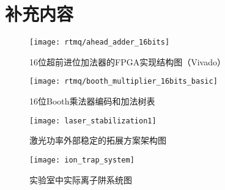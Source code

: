 
\chapter{补充内容}



\begin{figure}
    \centering
    \caption[16位超前进位加法器的FPGA实现结构图]{16位超前进位加法器的FPGA实现结构图（Vivado）\label{fig:ahead_adder_16bits}}
    \texttt{[image: rtmq/ahead\_adder\_16bits]}
\end{figure}


\begin{figure}
    \centering
    \caption[16位Booth乘法器编码和加法树表]{16位Booth乘法器编码和加法树表\label{fig:booth_multiplier_32bits_basic}}
    \texttt{[image: rtmq/booth\_multiplier\_16bits\_basic]}
\end{figure}




\begin{figure}
    \centering
    \caption[激光功率外部稳定的拓展方案架构图]{激光功率外部稳定的拓展方案架构图\label{fig:laser_stabilization}}
    \texttt{[image: laser\_stabilization1]}
\end{figure}

\begin{figure}
    \centering
    \caption[实验室中实际离子阱系统图]{实验室中实际离子阱系统图\label{fig:ion_trap_system}}
    \texttt{[image: ion\_trap\_system]}
\end{figure}